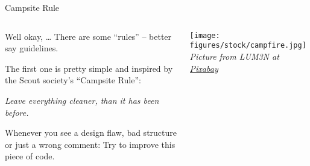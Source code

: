 \documentclass[aspectratio=1610, 9pt]{beamer}
\begin{document}
\begin{frame}{Campsite Rule}
    \begin{columns}
        \begin{column}{0.5\textwidth}
            \setlength{\parskip}{12pt}%
            Well okay, \ldots{} There are some “rules” -- better say guidelines.

            The first one is pretty simple and inspired by the Scout society's “Campsite Rule”:

            \begin{center}
                \textcolor{tugreen}{\emph{Leave everything cleaner, than it has been before.}}
            \end{center}

            Whenever you see a design flaw, bad structure or just a wrong comment:
            Try to improve this piece of code.
        \end{column}
        \begin{column}{0.5\textwidth}
            \texttt{[image: figures/stock/campfire.jpg]}
            {\footnotesize\textit{Picture from LUM3N at \href{https://pixabay.com/de/photos/lagerfeuer-lager-outdoor-topf-896196/}{Pixabay}}}
        \end{column}
    \end{columns}
\end{frame}
\end{document}
